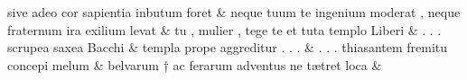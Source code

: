 \documentclass[12pt,onecolumn,twoside,a4paper]{memoir}
\begin{document}
\begin{pairs}
\begin{Leftside}
                              sive
                              adeo
                              cor
                              sapientia
                              inbutum
                              foret \&
                         \stanza {}
                     neque
                              tuum
                              te
                              ingenium
                              moderat
                              ,
                              neque
                              fraternum
                              ira
                              exilium
                              levat \&
                         \stanza {}
                     tu
                              ,
                              mulier
                              ,
                              tege
                              te
                              et
                              tuta
                              templo
                              Liberi \&
                         \stanza {}
                              .
                              .
                              .
                              scrupea
                              saxea
                              Bacchi & 
                     templa
                              prope
                              aggreditur
                              .
                              .
                              . \&
                         \stanza {}
                     .
                              .
                              .
                              thiasantem
                              fremitu
                              concepi
                              melum \&
                         \stanza {}
                     belvarum
                              †
                              ac
                              ferarum
                              adventus
                              ne
                              tætret
                              loca \&
                         \stanza {}
                     

\end{Leftside}
\end{pairs}
\end{document}
